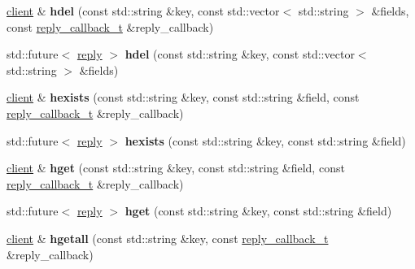 \begin{DoxyCompactItemize}
\item 
\mbox{\label{classcpp__redis_1_1client_adc62af1a2d07d04fbf274f98f374ab47}} 
\hyperlink{classcpp__redis_1_1client}{client} \& {\bfseries hdel} (const std\+::string \&key, const std\+::vector$<$ std\+::string $>$ \&fields, const \hyperlink{classcpp__redis_1_1client_a061a1140d36d2eaeda82b09a0bb3f9f2}{reply\+\_\+callback\+\_\+t} \&reply\+\_\+callback)
\item 
\mbox{\label{classcpp__redis_1_1client_a56d4df4d31ffc56e097a8a78cb85d861}} 
std\+::future$<$ \hyperlink{classcpp__redis_1_1reply}{reply} $>$ {\bfseries hdel} (const std\+::string \&key, const std\+::vector$<$ std\+::string $>$ \&fields)
\item 
\mbox{\label{classcpp__redis_1_1client_a36aa37c50e8b5e44e17c4f1f0d2c656e}} 
\hyperlink{classcpp__redis_1_1client}{client} \& {\bfseries hexists} (const std\+::string \&key, const std\+::string \&field, const \hyperlink{classcpp__redis_1_1client_a061a1140d36d2eaeda82b09a0bb3f9f2}{reply\+\_\+callback\+\_\+t} \&reply\+\_\+callback)
\item 
\mbox{\label{classcpp__redis_1_1client_a1fede52ba18414d75f37e776cc62b7f8}} 
std\+::future$<$ \hyperlink{classcpp__redis_1_1reply}{reply} $>$ {\bfseries hexists} (const std\+::string \&key, const std\+::string \&field)
\item 
\mbox{\label{classcpp__redis_1_1client_ac1db14da1ab3d1353ce35a1c923979e3}} 
\hyperlink{classcpp__redis_1_1client}{client} \& {\bfseries hget} (const std\+::string \&key, const std\+::string \&field, const \hyperlink{classcpp__redis_1_1client_a061a1140d36d2eaeda82b09a0bb3f9f2}{reply\+\_\+callback\+\_\+t} \&reply\+\_\+callback)
\item 
\mbox{\label{classcpp__redis_1_1client_aa84b4c8e9391f5ed37d4c9ef977e2c85}} 
std\+::future$<$ \hyperlink{classcpp__redis_1_1reply}{reply} $>$ {\bfseries hget} (const std\+::string \&key, const std\+::string \&field)
\item 
\mbox{\label{classcpp__redis_1_1client_a8bd82cb86dad87a944c039a57bf67968}} 
\hyperlink{classcpp__redis_1_1client}{client} \& {\bfseries hgetall} (const std\+::string \&key, const \hyperlink{classcpp__redis_1_1client_a061a1140d36d2eaeda82b09a0bb3f9f2}{reply\+\_\+callback\+\_\+t} \&reply\+\_\+callback)

\end{DoxyCompactItemize}

